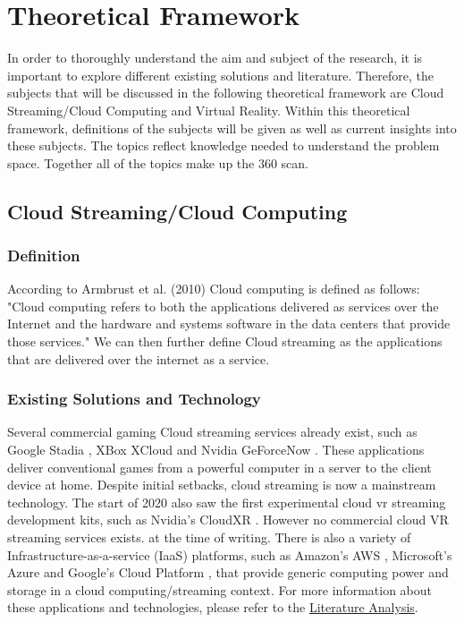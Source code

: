 \section{Theoretical Framework}

In order to thoroughly understand the aim and subject of the research, it is important to explore different existing solutions and literature. Therefore, the subjects that will be discussed in the  following theoretical framework are Cloud Streaming/Cloud Computing and Virtual Reality. Within this theoretical framework, definitions of the subjects will be given as well as current insights into these subjects. The topics reflect knowledge needed to understand the problem space. Together all of the topics make up the 360 scan.

\subsection{Cloud Streaming/Cloud Computing}

\subsubsection{Definition}
According to Armbrust et al. (2010) Cloud computing is defined as follows: 
"Cloud computing refers to both the applications delivered as services over the Internet and the hardware and systems software in the data centers that provide those services." \parencite[]{aviewoncc}
We can then further define Cloud streaming as the applications that are delivered over the internet as a service.

\subsubsection{Existing Solutions and Technology}
Several commercial gaming Cloud streaming services already exist, such as Google Stadia \parencite{stadia}, XBox XCloud \parencite{xcloud} and Nvidia GeForceNow \parencite{geforcenow}. These applications deliver conventional games from a powerful computer in a server to the client device at home. Despite initial setbacks, cloud streaming is now a mainstream technology. The start of 2020 also saw the first experimental cloud \acrshort{vr} streaming development kits, such as Nvidia's CloudXR \parencite{cloudxr}. However no commercial cloud VR streaming services exists. at the time of writing. There is also a variety of Infrastructure\hyp{}as\hyp{}a\hyp{}service (IaaS) platforms, such as Amazon's AWS \parencite{aws}, Microsoft's Azure \parencite{azure} and Google's Cloud Platform \parencite{gcp}, that provide generic computing power and storage in a cloud computing/streaming context. For more information about these applications and technologies, please refer to the \hyperref[sec:lit]{Literature Analysis}.

